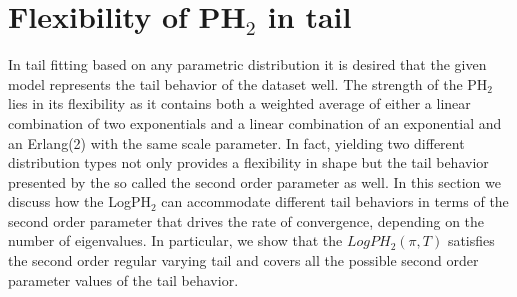 \documentclass[11pt]{article}
\begin{document}
%
%
%



\section{Flexibility of PH$_2$ in tail}
In tail fitting based on any parametric distribution it is desired that the given model represents the tail behavior of the dataset well. The strength of the PH$_2$ lies in its flexibility as it contains both a weighted average of either a linear combination of two exponentials and a linear combination of an exponential and an Erlang(2) with the same scale parameter. In fact, yielding two different distribution types not only provides a flexibility in shape but the tail behavior presented by the so called the second order parameter as well. In this section we discuss how the LogPH$_2$ can accommodate different tail behaviors in terms of the second order parameter that drives the rate of convergence, depending on the number of eigenvalues. In particular, we show that the $LogPH_2(\pi, T)$ satisfies the second order regular varying tail and covers all the possible second order parameter values of the tail behavior. \\
\end{document}
